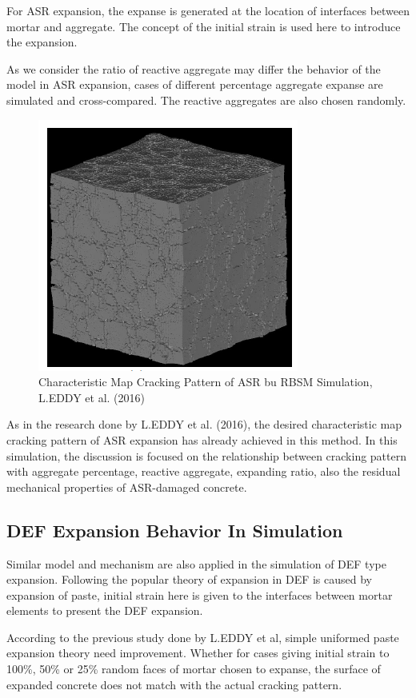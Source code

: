 For ASR expansion, the expanse is generated at the location of interfaces between mortar and aggregate. The concept of the initial strain is used here to introduce the expansion.

As we consider the ratio of reactive aggregate may differ the behavior of the model in ASR expansion,  cases of different percentage aggregate expanse are simulated and cross-compared. The reactive aggregates are also chosen randomly.

\begin{figure}
  \centering
  \includegraphics[width=0.4\linewidth]{Files/Background/EDDY_ASR.png}
  \caption{Characteristic Map Cracking Pattern of ASR bu RBSM Simulation, L.EDDY et al. (2016)}
  \label{}
\end{figure}

As in the research done by L.EDDY et al. (2016), the desired characteristic map cracking pattern of ASR expansion has already achieved in this method. In this simulation, the discussion is focused on the relationship between cracking pattern with aggregate percentage, reactive aggregate, expanding ratio, also the residual mechanical properties of ASR-damaged concrete.

\subsection{DEF Expansion Behavior In Simulation}

Similar model and mechanism are also applied in the simulation of DEF  type expansion. Following the popular theory of expansion in DEF  is caused by expansion of paste, initial strain here is given to the interfaces between mortar elements to present the DEF expansion.

According to the previous study done by L.EDDY et al, simple uniformed paste expansion theory need improvement. Whether for cases giving initial strain to 100\%, 50\% or 25\% random faces of mortar chosen to expanse, the surface of expanded concrete does not match with the actual cracking pattern.

